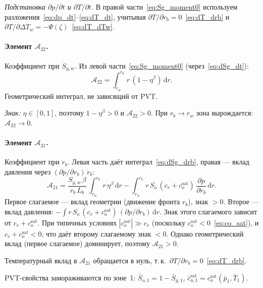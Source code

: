 \documentclass[12pt,a4paper]{article}
\newcommand{\dd}{\mathrm{d}}
\newcommand{\pp}{\partial}
\newcommand{\sat}{\mathrm{sat}}
\begin{document}
\emph{Подстановка $\pp p / \pp t$ и $\pp T / \pp t$.}
В правой части~\eqref{eq:Sg_moment0} используем
разложения~\eqref{eq:dp_dt}--\eqref{eq:dT_dt},
учитывая $\pp T / \pp r_b = 0$~\eqref{eq:dT_drb}
и $\pp T/\pp \Delta T_w = -\Psi(\zeta)$~\eqref{eq:dT_dTw}.

\paragraph{Элемент $\mathcal{A}_{22}$.}
Коэффициент при $\dot{S}_{g,w}$. Из левой
части~\eqref{eq:Sg_moment0} (через~\eqref{eq:dSg_dt}):
\begin{equation}\label{eq:A22}
  \boxed{
    \mathcal{A}_{22}
    = \int_{r_w}^{r_b} r\,(1 - \eta^\beta)\,\dd r.
  }
\end{equation}
Геометрический интеграл, не зависящий от PVT.

\emph{Знак:} $\eta \in [0,1]$, поэтому $1-\eta^\beta > 0$
и $\mathcal{A}_{22} > 0$. При $r_b \to r_w$ зона
вырождается: $\mathcal{A}_{22} \to 0$.

\paragraph{Элемент $\mathcal{A}_{21}$.}
Коэффициент при $\dot{r}_b$. Левая часть
даёт интеграл~\eqref{eq:dSg_drb}, правая ---
вклад давления через $(\pp p/\pp r_b)\,\dot{r}_b$:
\begin{equation}\label{eq:A21}
  \boxed{
    \mathcal{A}_{21}
    = \frac{S_{g,w}\,\beta}{r_b\,L_b}\,
      \int_{r_w}^{r_b} r\,\eta^\beta\,\dd r
    - \int_{r_w}^{r_b} r\,S_o\,(c_r + c_o^\sat)\,
      \frac{\pp p}{\pp r_b}\,\dd r.
  }
\end{equation}
Первое слагаемое --- вклад геометрии
(движение фронта $r_b$), знак $> 0$.
Второе --- вклад давления:
$-\int r\,S_o\,(c_r+c_o^\sat)\,(\pp p/\pp r_b)\,\dd r$.
Знак этого слагаемого зависит от $c_r + c_o^\sat$.
При типичных условиях $|c_o^\sat| \gg c_r$
(поскольку $c_o^\sat < 0$~\eqref{eq:co_sat}),
и $c_r + c_o^\sat < 0$, что даёт второму слагаемому
знак $< 0$. Однако геометрический вклад (первое
слагаемое) доминирует, поэтому $\mathcal{A}_{21} > 0$.

Температурный вклад в $\mathcal{A}_{21}$ обращается
в нуль, т.\,к.\ $\pp T / \pp r_b = 0$~\eqref{eq:dT_drb}.

PVT-свойства замораживаются по зоне~1:
$\bar{S}_{o,1} = 1 - \bar{S}_{g,1}$,
$\bar{c}_{o,1}^\sat = c_o^\sat(\bar{p}_1, \bar{T}_1)$.
\end{document}
